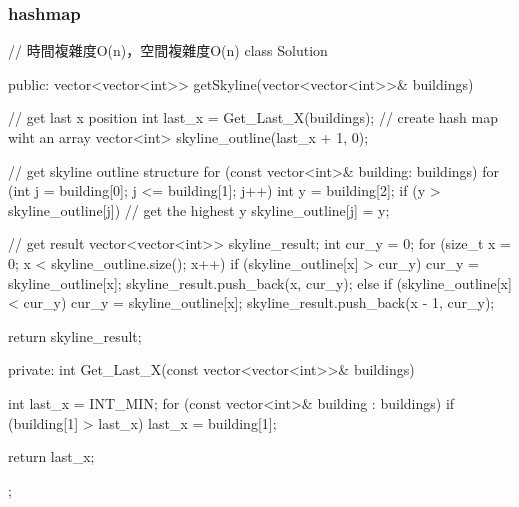 \subsubsection{hashmap}
\begin{Code}
  // 時間複雜度O(n)，空間複雜度O(n)
class Solution
{
public:
    vector<vector<int>> getSkyline(vector<vector<int>>& buildings)
    {
        // get last x position
        int last_x = Get_Last_X(buildings);
        // create hash map wiht an array
        vector<int> skyline_outline(last_x + 1, 0);

        // get skyline outline structure
        for (const vector<int>& building: buildings)
        {
            for (int j = building[0]; j <= building[1]; j++)
            {
                int y = building[2];
                if (y > skyline_outline[j])
                    // get the highest y
                    skyline_outline[j] = y;
            }
        }

        // get result
        vector<vector<int>> skyline_result;
        int cur_y = 0;
        for (size_t x = 0; x < skyline_outline.size(); x++)
        {
            if (skyline_outline[x] > cur_y)
            {
                cur_y = skyline_outline[x];
                skyline_result.push_back({x, cur_y});
            }
            else if (skyline_outline[x] < cur_y)
            {
                cur_y = skyline_outline[x];
                skyline_result.push_back({x - 1, cur_y});
            }
        }

        return skyline_result;
    }
private:
    int Get_Last_X(const vector<vector<int>>& buildings)
    {
        int last_x = INT_MIN;
        for (const vector<int>& building : buildings)
        {
            if (building[1] > last_x)
                last_x = building[1];
        }

        return last_x;
    }
};
\end{Code}
